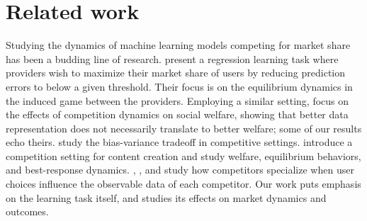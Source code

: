 \section{Related work}
Studying the dynamics of machine learning models competing for market share  has been a budding line of research. \citet{ben2017best,ben2019regression} 
present a regression learning task where providers wish to maximize their market share of users by reducing prediction errors to below a given threshold.
Their focus is on the equilibrium dynamics in the induced game between the providers.
Employing a similar setting, \citet{jagadeesan2024improved} focus on the effects of competition dynamics on social welfare, showing that better data representation does not necessarily translate to better welfare;
some of our results echo theirs.
\citet{Feng_2022} study the bias-variance tradeoff in competitive settings.
\citet{yao2023bad,yao2024rethinking,yao2024user} introduce a competition setting for content creation and study welfare,  equilibrium behaviors,
and best-response dynamics. \citet{ginart2021competing}, \citet{pmlr-v238-dean24a}, and \citet{pmlr-v235-su24a} study how competitors specialize when user choices influence the observable data of each competitor. 
Our work puts emphasis on the learning task itself,
and studies its effects on market dynamics and outcomes.

\squeeze


